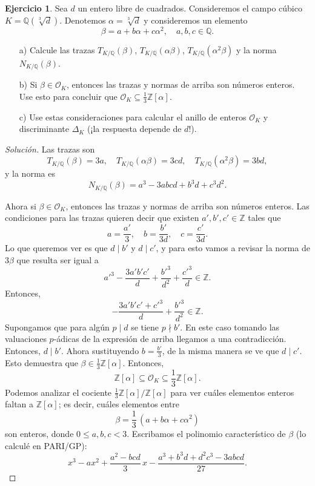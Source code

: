 \documentclass{article}
\newcounter{tarea}
\theoremstyle{definition}
\newtheorem{ejercicio}{Ejercicio}[tarea]
\newenvironment{solucion}{\begin{proof}[Solución]}{\end{proof}}
\newcommand{\ZZ}{\mathbb{Z}}
\newcommand{\QQ}{\mathbb{Q}}
\renewcommand{\O}{\mathcal{O}}
\begin{document}
\begin{ejercicio}
  Sea $d$ un entero libre de cuadrados. Consideremos el campo cúbico
  $K = \QQ (\sqrt[3]{d})$. Denotemos $\alpha = \sqrt[3]{d}$ y consideremos
  un elemento
  $$\beta = a + b\alpha + c\alpha^2, \quad a,b,c \in \QQ.$$

  \begin{enumerate}
  \item[a)] Calcule las trazas 
    $T_{K/\QQ} (\beta)$, $T_{K/\QQ} (\alpha\beta)$, $T_{K/\QQ} (\alpha^2\beta)$
    y la norma $N_{K/\QQ} (\beta)$.

  \item[b)] Si $\beta \in \O_K$, entonces las trazas y normas de arriba son
    números enteros. Use esto para concluir que
    $\O_K  \subseteq \frac{1}{3} \ZZ [\alpha]$.

  \item[c)] Use estas consideraciones para calcular el anillo de enteros $\O_K$
    y discriminante $\Delta_K$ (¡la respuesta depende de $d$!).
  \end{enumerate}

  \ifdefined\solutions
  \begin{solucion}
    Las trazas son
    \[ T_{K/\QQ} (\beta) = 3a, \quad
       T_{K/\QQ} (\alpha\beta) = 3cd, \quad
       T_{K/\QQ} (\alpha^2\beta) = 3bd, \]
    y la norma es
    $$N_{K/\QQ} (\beta) = a^3 - 3 abcd + b^3 d + c^3 d^2.$$

    Ahora si $\beta \in \O_K$, entonces las trazas y normas de arriba son
    números enteros. Las condiciones para las trazas quieren decir que existen
    $a',b',c' \in \ZZ$ tales que
    \[ a = \frac{a'}{3}, \quad b = \frac{b'}{3d}, \quad c = \frac{c'}{3d}. \]
    Lo que queremos ver es que $d \mid b'$ y $d \mid c'$, y para esto vamos a revisar
    la norma de $3\beta$ que resulta ser igual a
    $$a'^3 - \frac{3 a' b' c'}{d} + \frac{b'^3}{d^2} + \frac{c'^3}{d} \in \ZZ.$$
    Entonces,
    $$-\frac{3 a' b' c' + c'^3}{d} + \frac{b'^3}{d^2} \in \ZZ.$$
    Supongamos que para algún $p \mid d$ se tiene $p \nmid b'$. En este caso
    tomando las valuaciones $p$-ádicas de la expresión de arriba llegamos a una
    contradicción. Entonces, $d \mid b'$. Ahora sustituyendo $b = \frac{b'}{3}$,
    de la misma manera se ve que $d \mid c'$. Esto demuestra que
    $\beta \in \frac{1}{3}\ZZ[\alpha]$. Entonces,
    $$\ZZ [\alpha] \subseteq \O_K \subseteq \frac{1}{3}\ZZ[\alpha].$$
    Podemos analizar el cociente $\frac{1}{3}\ZZ[\alpha]/\ZZ[\alpha]$ para ver cuáles
    elementos enteros faltan a $\ZZ [\alpha]$; es decir, cuáles elementos entre
    $$\beta = \frac{1}{3}\,(a + b\alpha + c\alpha^2)$$
    son enteros, donde $0 \le a,b,c < 3$. Escribamos el polinomio característico
    de $\beta$ (lo calculé en PARI/GP):
    \[ x^3 - ax^2 + \frac{a^2 - bcd}{3}\,x - \frac{a^3 + b^3 d + d^2 c^3 - 3 abcd}{27}. \]


\end{solucion}
\end{ejercicio}
\end{document}
